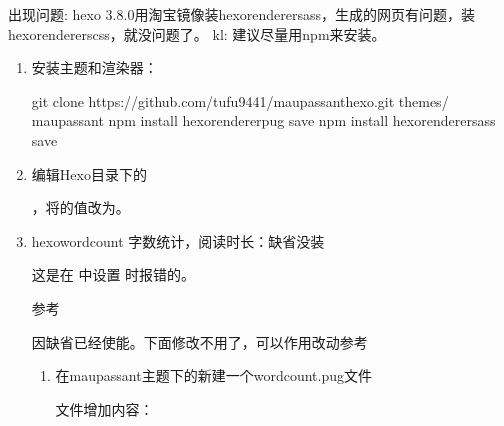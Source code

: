 \documentclass[letterpaper,12pt,english]{sphinxmanual}
\begin{document}
出现问题: hexo 3.8.0用淘宝镜像装hexo\sphinxhyphen{}renderer\sphinxhyphen{}sass，生成的网页有问题，装hexo\sphinxhyphen{}renderer\sphinxhyphen{}scss，就没问题了。
kl: 建议尽量用npm来安装。
\begin{enumerate}
%
\item {} 
安装主题和渲染器：

\begin{sphinxVerbatim}[commandchars=\\\{\}]
\PYGZdl{} git clone https://github.com/tufu9441/maupassant\PYGZhy{}hexo.git themes/    maupassant
\PYGZdl{} npm install hexo\PYGZhy{}renderer\PYGZhy{}pug \PYGZhy{}\PYGZhy{}save
\PYGZdl{} npm install hexo\PYGZhy{}renderer\PYGZhy{}sass \PYGZhy{}\PYGZhy{}save
\end{sphinxVerbatim}

\item {} 
编辑Hexo目录下的

，将的值改为。

\item {} 
hexo\sphinxhyphen{}wordcount 字数统计，阅读时长：缺省没装

这是在  中设置  时报错的。

参考 


因缺省已经使能。下面修改不用了，可以作用改动参考
\begin{enumerate}
%
\item {} 
在maupassant主题下的新建一个wordcount.pug文件

 文件增加内容：


\end{enumerate}
\end{enumerate}
\end{document}
